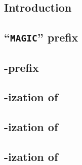 \subsection{Introduction}                        \label{rlp auth: rlp utils calls: intro}    
\subsection{``\texttt{MAGIC}'' prefix}           \label{rlp auth: rlp utils calls: magic}    
\subsection{\rlp{}-prefix}                       \label{rlp auth: rlp utils calls: prefix}   
\subsection{\rlp{}-ization of }   \label{rlp auth: rlp utils calls: chain id} 
\subsection{\rlp{}-ization of }     \label{rlp auth: rlp utils calls: address}  
\subsection{\rlp{}-ization of }       \label{rlp auth: rlp utils calls: nonce}    
